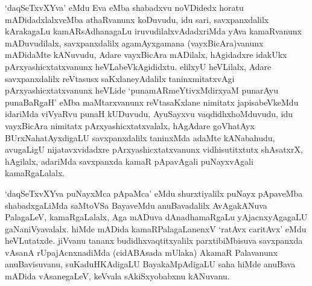 \begin{artha}
`daqSeTxvXYva' eMdu Eva eMba shabadxvu noVDidedx horatu mADidadxlalxveMba athaRvanunx koDuvudu, idu sari, savxpanxdalilx kArakagaLu kamARsAdhanagaLu iruvudilalxvAdadxriMda yAva kamaRvanunx mADuvudilalx, savxpanxdalilx agamAyxgamana (vayxBicAra)vanunx mADidaMte kANuvudu, Adare vayxBicAra mADilalx, hAgidadxre idakUkx pArxyashicxtatxvanunx heVLabeVkAgididxtu. elilxyU heVLilalx, Adare savxpanxdalilx reVtasusx saKxlaneyAdalilx taninxmitatxvAgi pArxyashicxtatxvanunx heVLide `punamARmeYtivxMdirxyaM punarAyu punaBaRgaH' eMba maMtarxvanunx reVtasaKxlane nimitatx japisabeVkeMdu idariMda viVyaRvu punaH kUDuvudu, AyuSayxvu vaqdidhxhoMduvudu, idu vayxBicAra nimitatx pArxyashicxtatxvalalx, hAgAdare goVhatAyx BUrxNahatAyxdigaLU savxpanxdalilx taninxMda adaMte kANabahudu, avugaLigU nijatavxvidadxre pArxyashicxtatxvanunx vidhisutitxtutx shAsatxrX, hAgilalx, adariMda savxpanxda kamaR pApavAgali puNayxvAgali kamaRgaLalalx. 
\end{artha}

\begin{artha}
`daqSeTxvXYva puNayxMca pApaMca' eMdu shurxtiyalilx puNayx pApaveMba shabadxgaLiMda saMtoVSa BayaveMdu anuBavadalilx AvAgakANuva PalagaLeV, kamaRgaLalalx, Aga mADuva dAnadhamaRgaLu yAjacnxyAgagaLU gaNaniVyavalalx. hiMde mADida kamaRPalagaLanenxV `ratAvx caritAvx' eMdu heVLutatxde. jiVvanu tananx budidhxvaqtitxyalilx parxtibiMbisuva savxpanxda vAsanA rUpajAcnxnadiMda (cidABAsada mUlaka) AkamaR Palavanunx anuBavisuvanu, suKaduHKAdigaLU BayakaMpAdigaLU saha hiMde anuBava mADida vAsanegaLeV, keVvala sAkiSxyobabxnu kANuvanu.
\end{artha}

